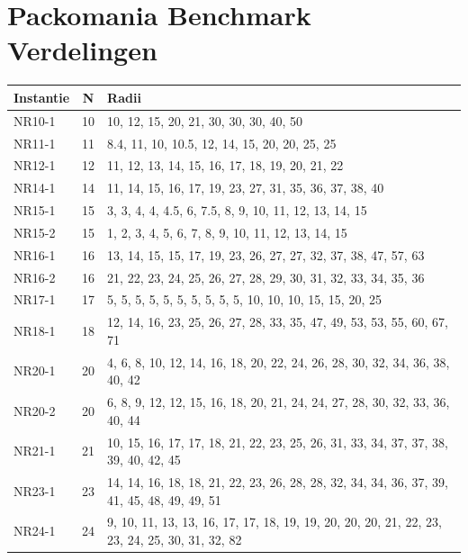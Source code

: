 \documentclass[12pt,a4paper,oneside]{book}
\begin{document}
{\newpage






\appendix

\chapter{Packomania Benchmark Verdelingen} \label{append:packomania-benchmark-verdelingen}

\begin{tabularx}{\textwidth}{ l c X }
\caption{Packomania Benchmark Verdelingen}
\\\toprule
Instantie & N & Radii \\
\midrule
\endhead
NR10-1 & 10 & 10, 12, 15, 20, 21, 30, 30, 30, 40, 50 \\
NR11-1 & 11 & 8.4, 11, 10, 10.5, 12, 14, 15, 20, 20, 25, 25 \\
NR12-1 & 12 & 11, 12, 13, 14, 15, 16, 17, 18, 19, 20, 21, 22 \\
NR14-1 & 14 & 11, 14, 15, 16, 17, 19, 23, 27, 31, 35, 36, 37, 38, 40 \\
NR15-1 & 15 & 3, 3, 4, 4, 4.5, 6, 7.5, 8, 9, 10, 11, 12, 13, 14, 15 \\
NR15-2 & 15 & 1, 2, 3, 4, 5, 6, 7, 8, 9, 10, 11, 12, 13, 14, 15 \\
NR16-1 & 16 & 13, 14, 15, 15, 17, 19, 23, 26, 27, 27, 32, 37, 38, 47, 57, 63 \\
NR16-2 & 16 & 21, 22, 23, 24, 25, 26, 27, 28, 29, 30, 31, 32, 33, 34, 35, 36 \\
NR17-1 & 17 & 5, 5, 5, 5, 5, 5, 5, 5, 5, 5, 10, 10, 10, 15, 15, 20, 25 \\
NR18-1 & 18 & 12, 14, 16, 23, 25, 26, 27, 28, 33, 35, 47, 49, 53, 53, 55, 60, 67, 71 \\
NR20-1 & 20 & 4, 6, 8, 10, 12, 14, 16, 18, 20, 22, 24, 26, 28, 30, 32, 34, 36, 38, 40, 42 \\
NR20-2 & 20 & 6, 8, 9, 12, 12, 15, 16, 18, 20, 21, 24, 24, 27, 28, 30, 32, 33, 36, 40, 44 \\
NR21-1 & 21 & 10, 15, 16, 17, 17, 18, 21, 22, 23, 25, 26, 31, 33, 34, 37, 37, 38, 39, 40, 42, 45 \\
NR23-1 & 23 & 14, 14, 16, 18, 18, 21, 22, 23, 26, 28, 28, 32, 34, 34, 36, 37, 39, 41, 45, 48, 49, 49, 51 \\
NR24-1 & 24 & 9, 10, 11, 13, 13, 16, 17, 17, 18, 19, 19, 20, 20, 20, 21, 22, 23, 23, 24, 25, 30, 31, 32, 82 \\

\end{tabularx}}
\end{document}
